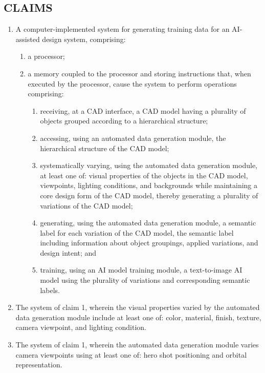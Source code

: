 \documentclass[12pt]{article}
\begin{document}
\begin{itemize}
\section{CLAIMS}
\begin{enumerate}
\item A computer-implemented system for generating training data for an AI-assisted design system, comprising:
   \begin{enumerate}
       \item a processor;
       \item a memory coupled to the processor and storing instructions that, when executed by the processor, cause the system to perform operations comprising: 
       \begin{enumerate}
           \item receiving, at a CAD interface, a CAD model having a plurality of objects grouped according to a hierarchical structure;
           \item accessing, using an automated data generation module, the hierarchical structure of the CAD model;
           \item systematically varying, using the automated data generation module, at least one of: visual properties of the objects in the CAD model, viewpoints, lighting conditions, and backgrounds while maintaining a core design form of the CAD model, thereby generating a plurality of variations of the CAD model;
           \item generating, using the automated data generation module, a semantic label for each variation of the CAD model, the semantic label including information about object groupings, applied variations, and design intent; and 
           \item training, using an AI model training module, a text-to-image AI model using the plurality of variations and corresponding semantic labels.
       \end{enumerate}
   \end{enumerate}

\item The system of claim 1, wherein the visual properties varied by the automated data generation module include at least one of: color, material, finish, texture, camera viewpoint, and lighting condition.

\item The system of claim 1, wherein the automated data generation module varies camera viewpoints using at least one of: hero shot positioning and orbital representation.


\end{enumerate}
\end{itemize}
\end{document}
